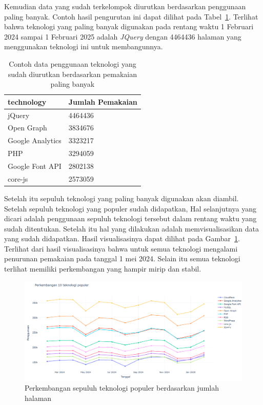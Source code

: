 Kemudian data yang sudah terkelompok diurutkan berdasarkan penggunaan paling banyak. Contoh hasil pengurutan ini dapat dilihat pada Tabel~\ref{tab:urutgbsample}. Terlihat bahwa teknologi yang paling banyak digunakan pada rentang waktu 1 Februari 2024 sampai 1 Februari 2025 adalah \textit{JQuery} dengan 4464436 halaman \web yang menggunakan teknologi ini untuk membangunnya.
\begin{table}[H]
    \centering
    \caption{Contoh data penggunaan teknologi yang sudah diurutkan berdasarkan pemakaian paling banyak}
    \label{tab:urutgbsample}
    \begin{tabular}{|l|l|}
        \hline
        technology & Jumlah Pemakaian \\ \hline
        jQuery & 4464436 \\ \hline
        Open Graph & 3834676 \\ \hline
        Google Analytics & 3323217 \\ \hline
        PHP & 3294059 \\ \hline
        Google Font API & 2802138 \\ \hline
        core-js & 2573059 \\ \hline
    \end{tabular}
\end{table}

Setelah itu sepuluh teknologi yang paling banyak digunakan akan diambil. Setelah sepuluh teknologi yang populer sudah didapatkan, Hal selanjutnya yang dicari adalah penggunaan sepuluh teknologi tersebut dalam rentang waktu yang sudah ditentukan. Setelah itu hal yang dilakukan adalah memvisualisasikan data yang sudah didapatkan. Hasil visualisasinya dapat dilihat pada Gambar~\ref{fig:sample10}. Terlihat dari hasil visualisasinya bahwa untuk semua teknologi mengalami penurunan pemakaian pada tanggal 1 mei 2024. Selain itu semua teknologi terlihat memiliki perkembangan yang hampir mirip dan stabil.
\begin{figure}[H]
    \centering
    \includegraphics[width=0.7\linewidth]{Gambar/Perkembangn 10 teknologi populer.png}
    \caption{Perkembangan sepuluh teknologi populer berdasarkan jumlah halaman \web}
    \label{fig:sample10}
\end{figure}
